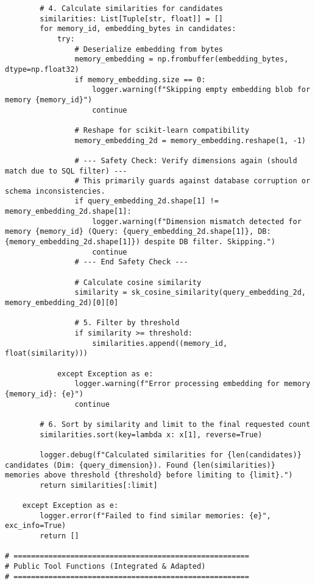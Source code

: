 \documentclass[12pt,a4paper]{article}
\begin{document}
\begin{pageablecode}
\begin{verbatim}
        # 4. Calculate similarities for candidates
        similarities: List[Tuple[str, float]] = []
        for memory_id, embedding_bytes in candidates:
            try:
                # Deserialize embedding from bytes
                memory_embedding = np.frombuffer(embedding_bytes, dtype=np.float32)
                if memory_embedding.size == 0:
                    logger.warning(f"Skipping empty embedding blob for memory {memory_id}")
                    continue

                # Reshape for scikit-learn compatibility
                memory_embedding_2d = memory_embedding.reshape(1, -1)

                # --- Safety Check: Verify dimensions again (should match due to SQL filter) ---
                # This primarily guards against database corruption or schema inconsistencies.
                if query_embedding_2d.shape[1] != memory_embedding_2d.shape[1]:
                    logger.warning(f"Dimension mismatch detected for memory {memory_id} (Query: {query_embedding_2d.shape[1]}, DB: {memory_embedding_2d.shape[1]}) despite DB filter. Skipping.")
                    continue
                # --- End Safety Check ---

                # Calculate cosine similarity
                similarity = sk_cosine_similarity(query_embedding_2d, memory_embedding_2d)[0][0]

                # 5. Filter by threshold
                if similarity >= threshold:
                    similarities.append((memory_id, float(similarity)))

            except Exception as e:
                logger.warning(f"Error processing embedding for memory {memory_id}: {e}")
                continue

        # 6. Sort by similarity and limit to the final requested count
        similarities.sort(key=lambda x: x[1], reverse=True)

        logger.debug(f"Calculated similarities for {len(candidates)} candidates (Dim: {query_dimension}). Found {len(similarities)} memories above threshold {threshold} before limiting to {limit}.")
        return similarities[:limit]

    except Exception as e:
        logger.error(f"Failed to find similar memories: {e}", exc_info=True)
        return []
    
# ======================================================
# Public Tool Functions (Integrated & Adapted)
# ======================================================


\end{verbatim}
\end{pageablecode}
\end{document}
